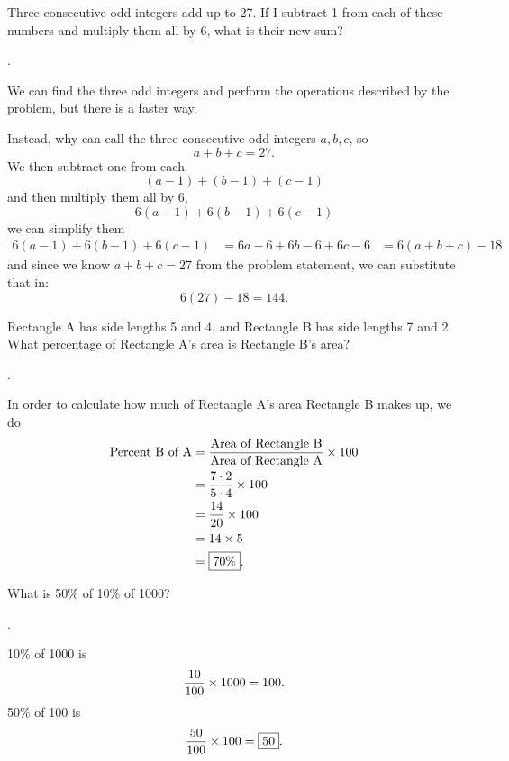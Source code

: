 \documentclass[11pt]{article}
\DeclareRobustCommand{\frac}[3][0pt]{%
  {\begingroup\hspace{#1}#2\hspace{#1}\endgroup\over\hspace{#1}#3\hspace{#1}}}
\begin{document}
\begin{problem}Three consecutive odd integers add up to 27. If I subtract 1 from each of these numbers and multiply them all by 6, what is their new sum?
\end{problem}
\begin{answer}
.
\end{answer}
\begin{solution}
We can find the three odd integers and perform the operations described by the problem, but there is a faster way. \par
Instead, why can call the three consecutive odd integers $a, b, c$, so
$$a+b+c=27.$$
We then subtract one from each
$$(a-1)+(b-1)+(c-1)$$
and then multiply them all by 6,
$$6(a-1)+6(b-1)+6(c-1)$$
we can simplify them
\begin{align*}
6(a-1)+6(b-1)+6(c-1) &= 6a-6+6b-6+6c-6
&= 6(a+b+c) - 18
\end{align*}
and since we know $a+b+c=27$ from the problem statement, we can substitute that in:
$$6(27)-18 = \boxed{144}.$$
\end{solution}

\begin{problem}Rectangle A has side lengths 5 and 4, and Rectangle B has side lengths 7 and 2. What percentage of Rectangle A's area is  Rectangle B's area?
\end{problem}
\begin{answer}
.
\end{answer}
\begin{solution}
In order to calculate how much of Rectangle A's area Rectangle B makes up, we do
\begin{align*}
\text{Percent B of A} &= \frac{\text{Area of Rectangle B}}{\text{Area of Rectangle A}} \times 100 \\
&= \frac{7 \cdot 2}{5 \cdot 4} \times 100 \\
&= \frac{14}{20} \times 100 \\
&= 14 \times 5 \\
&= \boxed{70 \%}.
\end{align*}
\end{solution}


\begin{problem}
What is 50\% of 10\% of 1000?
\end{problem}
\begin{answer}
.
\end{answer}
\begin{solution}
10\% of 1000 is
$$\frac{10}{100} \times 1000 = 100.$$
50\% of 100 is
$$\frac{50}{100} \times 100 = \boxed{50}.$$
\end{solution}
\end{document}
